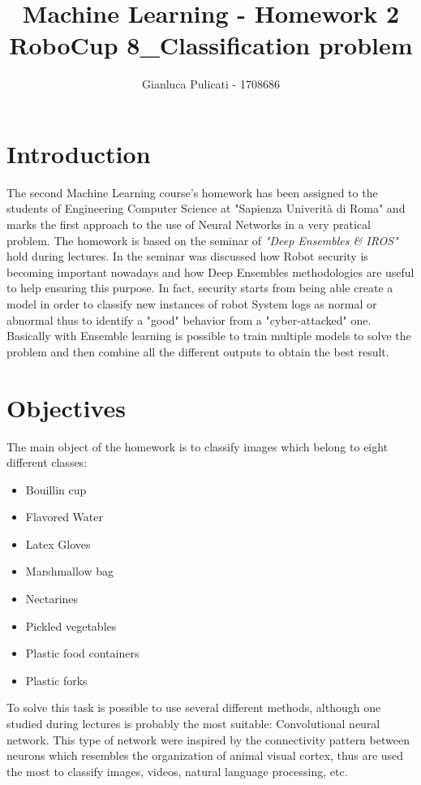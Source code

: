 \documentclass[11pt]{scrartcl}
\title{Machine Learning - Homework 2 \\
		\vspace{+0.5cm}
		\LARGE{RoboCup 8\_Classification problem}}
\author{Gianluca Pulicati - 1708686}
\date{\vspace{-5ex}}
\begin{document}
\maketitle

\vspace{+0.01cm}
\section*{Introduction}
\noindent
\large{The second Machine Learning course's homework  has been assigned to the students of Engineering Computer Science at "Sapienza Univerità di Roma" and marks the first approach to the use of Neural Networks in a very pratical problem. \newline
The homework is based on the seminar of \textit{"Deep Ensembles \& IROS"} hold during lectures. In the seminar was discussed how Robot security is becoming important nowadays and how Deep Ensembles methodologies are useful to help ensuring this purpose. In fact, security starts from being able create a model in order to classify new instances of robot System logs as normal or abnormal thus to identify a "good" behavior from a "cyber-attacked" one. Basically with Ensemble learning is possible to train multiple models to solve the problem and then combine all the different outputs to obtain the best result.
}

\vspace{1.0cm}

\section* {Objectives}
\noindent
\large{The main object of the homework is to classify images which belong to eight different classes:}

\begin{itemize}
	\item Bouillin cup
	\item Flavored Water
	\item Latex Gloves
	\item Marshmallow bag
	\item Nectarines
	\item Pickled vegetables
	\item Plastic food containers
	\item Plastic forks
\end{itemize}

\noindent
\large{To solve this task is possible to use several different methods, although one studied during lectures is probably the most suitable: Convolutional neural network. This type of network were inspired by the connectivity pattern between neurons which resembles the organization of animal visual cortex, thus are used the most to classify images, videos, natural language processing, etc. }
\end{document}
